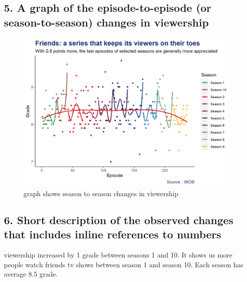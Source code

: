 \documentclass[
  letterpaper,
  DIV=11,
  numbers=noendperiod]{scrartcl}
\begin{document}
\hypertarget{a-graph-of-the-episode-to-episode-or-season-to-season-changes-in-viewership}{%
\subsection{5. A graph of the episode-to-episode (or season-to-season)
changes in
viewership}\label{a-graph-of-the-episode-to-episode-or-season-to-season-changes-in-viewership}}

\begin{figure}

{\centering \includegraphics{friends_viewer_season.png}

}

\caption{graph shows season to season changes in viewership}

\end{figure}

\hypertarget{short-description-of-the-observed-changes-that-includes-inline-references-to-numbers}{%
\subsection{6. Short description of the observed changes that includes
inline references to
numbers}\label{short-description-of-the-observed-changes-that-includes-inline-references-to-numbers}}

viewership increased by 1 grade between seasons 1 and 10. It shows us
more people watch friends tv shows between season 1 and season 10. Each
season has average 8.5 grade.
\end{document}
